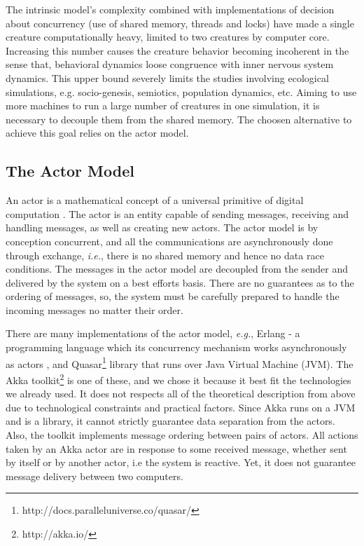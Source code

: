 \documentclass[runningheads]{llncs}
\begin{document}
The intrinsic model's complexity combined with implementations of decision about concurrency (use of shared memory, threads and locks) have made a single creature computationally heavy, limited to two creatures by computer core. Increasing this number causes the creature behavior becoming incoherent in the sense that, behavioral dynamics loose congruence with inner nervous system dynamics. This upper bound  severely limits the studies involving ecological simulations, e.g. socio-genesis, semiotics, population dynamics, etc. Aiming to use more machines to run a large number of creatures in one simulation, it is necessary to decouple them from the shared memory. The choosen alternative to achieve this goal relies on the actor model.

\subsection{The Actor Model}
\label{subsec:actors}
An actor is a mathematical concept of a universal primitive of digital computation \cite{Hewitt2012}. The actor is an entity capable of sending messages, receiving and handling messages, as well as creating new actors. The actor model is by conception concurrent, and all the communications are asynchronously done through exchange, \textit{i.e.},  there is no shared memory and hence no data race conditions. The messages in the actor model are decoupled from the sender and delivered by the system on a best efforts basis\cite{Hewitt2014}. There are no guarantees as to the ordering of messages, so, the system must be carefully prepared to handle the incoming messages no matter their order.

There are many implementations of the actor model, \textit{e.g.}, Erlang - a programming language which its concurrency mechanism works  asynchronously as actors \cite{Armstrong2007}, and Quasar\footnote[1]{http://docs.paralleluniverse.co/quasar/} library that runs over Java Virtual Machine (JVM). The Akka toolkit\footnote[2]{http://akka.io/} is one of these, and we chose it because it best fit the technologies we already used. It does not respects all of the theoretical description from above due to technological constraints and practical factors. Since Akka runs on a JVM and is a library, it cannot strictly guarantee data separation from the actors. Also, the toolkit implements message ordering between pairs of actors. All actions taken by an Akka actor are in response to some received message, whether sent by itself or by another actor, i.e the system is reactive. Yet, it does not guarantee message delivery between two computers.
\end{document}
